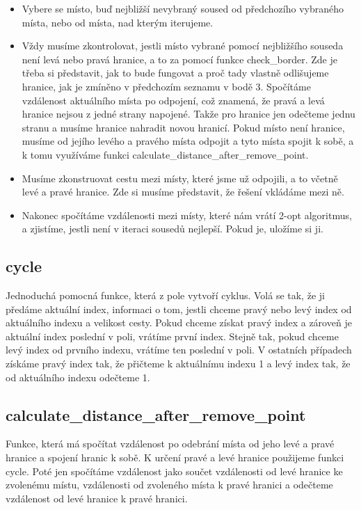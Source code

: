 \begin{itemize}
\item Vybere se místo, buď nejbližší nevybraný soused od předchozího vybraného místa, nebo od místa, nad kterým iterujeme.
\item Vždy musíme zkontrolovat, jestli místo vybrané pomocí nejbližšího souseda není levá nebo pravá hranice, a to za pomocí funkce check\_border. Zde je třeba si představit, jak to bude fungovat a proč tady vlastně odlišujeme hranice, jak je zmíněno v předchozím seznamu v bodě 3. Spočítáme vzdálenost aktuálního místa po odpojení, což znamená, že pravá a levá hranice nejsou z jedné strany napojené. Takže pro hranice jen odečteme jednu stranu a musíme hranice nahradit novou hranicí. Pokud místo není hranice, musíme od jejího levého a pravého místa odpojit a tyto místa spojit k sobě, a k tomu využíváme funkci calculate\_distance\_after\_remove\_point.
\item Musíme zkonstruovat cestu mezi místy, které jsme už odpojili, a to včetně levé a pravé hranice. Zde si musíme představit, že řešení vkládáme mezi ně.
\item Nakonec spočítáme vzdálenosti mezi místy, které nám vrátí 2-opt algoritmus, a zjistíme, jestli není v iteraci sousedů nejlepší. Pokud je, uložíme si ji.
\end{itemize}
    \subsection{cycle}
Jednoduchá pomocná funkce, která z pole vytvoří cyklus. Volá se tak, že ji předáme aktuální index, informaci o tom, jestli chceme pravý nebo levý index od aktuálního indexu a velikost cesty. Pokud chceme získat pravý index a zároveň je aktuální index poslední v poli, vrátíme první index. Stejně tak, pokud chceme levý index od prvního indexu, vrátíme ten poslední v poli. V ostatních případech získáme pravý index tak, že přičteme k aktuálnímu indexu 1 a levý index tak, že od aktuálního indexu odečteme 1.

\subsection{calculate\_distance\_after\_remove\_point}
Funkce, která má spočítat vzdálenost po odebrání místa od jeho levé a pravé hranice a spojení hranic k sobě. K určení pravé a levé hranice použijeme funkci cycle. Poté jen spočítáme vzdálenost jako součet vzdálenosti od levé hranice ke zvolenému místu, vzdálenosti od zvoleného místa k pravé hranici a odečteme vzdálenost od levé hranice k pravé hranici.

